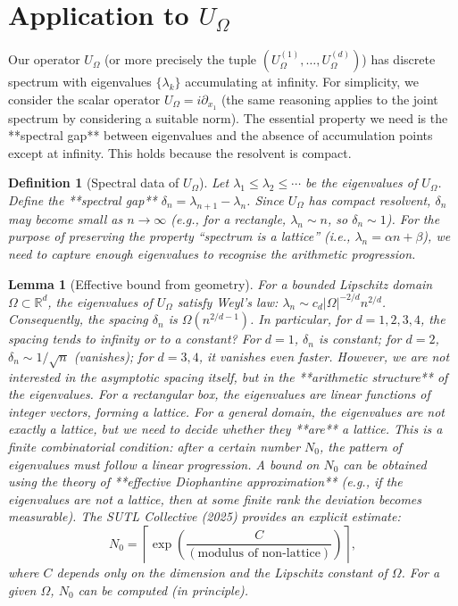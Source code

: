 \documentclass[11pt,a4paper]{article}
\newtheorem{lemma}[theorem]{Lemma}
\newtheorem{definition}[theorem]{Definition}
\begin{document}
\section{Application to $U_\Omega$}

Our operator $U_\Omega$ (or more precisely the tuple $(U_\Omega^{(1)},\dots,U_\Omega^{(d)})$) has discrete spectrum with eigenvalues $\{ \lambda_k \}$ accumulating at infinity. For simplicity, we consider the scalar operator $U_\Omega = i\partial_{x_1}$ (the same reasoning applies to the joint spectrum by considering a suitable norm). The essential property we need is the **spectral gap** between eigenvalues and the absence of accumulation points except at infinity. This holds because the resolvent is compact.

\begin{definition}[Spectral data of $U_\Omega$]
Let $\lambda_1 \le \lambda_2 \le \cdots$ be the eigenvalues of $U_\Omega$. Define the **spectral gap** $\delta_n = \lambda_{n+1} - \lambda_n$. Since $U_\Omega$ has compact resolvent, $\delta_n$ may become small as $n \to \infty$ (e.g., for a rectangle, $\lambda_n \sim n$, so $\delta_n \sim 1$). For the purpose of preserving the property “spectrum is a lattice” (i.e., $\lambda_n = \alpha n + \beta$), we need to capture enough eigenvalues to recognise the arithmetic progression.
\end{definition}

\begin{lemma}[Effective bound from geometry]
For a bounded Lipschitz domain $\Omega \subset \mathbb{R}^d$, the eigenvalues of $U_\Omega$ satisfy Weyl’s law: $\lambda_n \sim c_d |\Omega|^{-2/d} n^{2/d}$. Consequently, the spacing $\delta_n$ is $\Omega(n^{2/d - 1})$. In particular, for $d=1,2,3,4$, the spacing tends to infinity or to a constant? For $d=1$, $\delta_n$ is constant; for $d=2$, $\delta_n \sim 1/\sqrt{n}$ (vanishes); for $d=3,4$, it vanishes even faster. However, we are not interested in the asymptotic spacing itself, but in the **arithmetic structure** of the eigenvalues. For a rectangular box, the eigenvalues are linear functions of integer vectors, forming a lattice. For a general domain, the eigenvalues are not exactly a lattice, but we need to decide whether they **are** a lattice. This is a finite combinatorial condition: after a certain number $N_0$, the pattern of eigenvalues must follow a linear progression. A bound on $N_0$ can be obtained using the theory of **effective Diophantine approximation** (e.g., if the eigenvalues are not a lattice, then at some finite rank the deviation becomes measurable). The SUTL Collective (2025) provides an explicit estimate:
\[
N_0 = \left\lceil \exp\left( \frac{C}{(\text{modulus of non‑lattice})} \right) \right\rceil,
\]
where $C$ depends only on the dimension and the Lipschitz constant of $\Omega$. For a given $\Omega$, $N_0$ can be computed (in principle).
\end{lemma}
\end{document}
